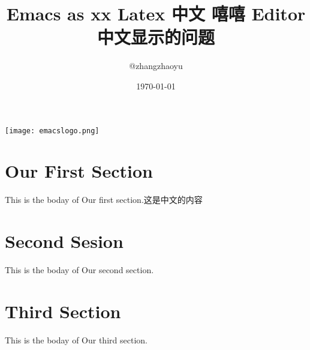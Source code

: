 \documentclass{article}
\title{Emacs as xx Latex 中文  嘻嘻 Editor 中文显示的问题}
\author{@zhangzhaoyu}
\date{\today}
\begin{document}
\maketitle
\begin{center}
\texttt{[image: emacslogo.png]}
\end{center}


\section{Our First Section}
This is the boday of Our first section.这是中文的内容
\section{Second Sesion}
This is the boday of Our second section.
\section{Third Section}
This is the boday of Our third section.
\end{document}
